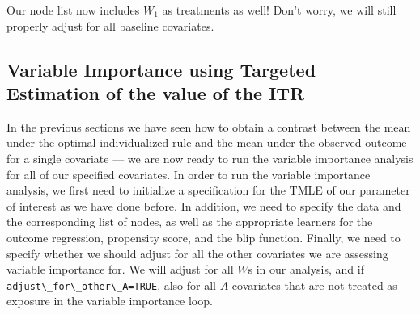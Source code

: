 \documentclass[
  12pt, krantz2,
]{krantz}
\newcommand{\passthrough}[1]{#1}
\newcommand{\1}{\mathbbm{1}}
\theoremstyle{definition}
\theoremstyle{definition}
\theoremstyle{definition}
\theoremstyle{definition}
\theoremstyle{remark}
\begin{document}
Our node list now includes \(W_1\) as treatments as well! Don't worry,
we will still properly adjust for all baseline covariates.

\hypertarget{variable-importance-using-targeted-estimation-of-the-value-of-the-itr}{%
\subsection{Variable Importance using Targeted Estimation of the value of the ITR}\label{variable-importance-using-targeted-estimation-of-the-value-of-the-itr}}

In the previous sections we have seen how to obtain a contrast between the mean
under the optimal individualized rule and the mean under the observed outcome
for a single covariate --- we are now ready to run the variable importance analysis
for all of our specified covariates. In order to run the variable importance
analysis, we first need to initialize a specification for the TMLE of our
parameter of interest as we have done before. In addition, we need to specify
the data and the corresponding list of nodes, as well as the appropriate
learners for the outcome regression, propensity score, and the blip function.
Finally, we need to specify whether we should adjust for all the other
covariates we are assessing variable importance for. We will adjust for all \(W\)s
in our analysis, and if \passthrough{\lstinline!adjust\_for\_other\_A=TRUE!}, also for all \(A\) covariates
that are not treated as exposure in the variable importance loop.
\end{document}
